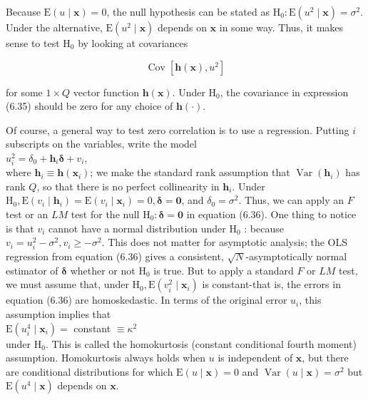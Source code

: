 \documentclass[10pt]{article}
\begin{document}
Because $\mathrm{E}(u \mid \mathbf{x})=0$, the null hypothesis can be stated as $\mathrm{H}_{0}: \mathrm{E}\left(u^{2} \mid \mathbf{x}\right)=\sigma^{2}$. Under the alternative, $\mathrm{E}\left(u^{2} \mid \mathbf{x}\right)$ depends on $\mathbf{x}$ in some way. Thus, it makes sense to test $\mathrm{H}_{0}$ by looking at covariances


\begin{equation*}
\operatorname{Cov}\left[\mathbf{h}(\mathbf{x}), u^{2}\right] \tag{6.35}
\end{equation*}


for some $1 \times Q$ vector function $\mathbf{h}(\mathbf{x})$. Under $\mathrm{H}_{0}$, the covariance in expression (6.35) should be zero for any choice of $\mathbf{h}(\cdot)$.

Of course, a general way to test zero correlation is to use a regression. Putting $i$ subscripts on the variables, write the model\\
$u_{i}^{2}=\delta_{0}+\mathbf{h}_{i} \boldsymbol{\delta}+v_{i}$,\\
where $\mathbf{h}_{i} \equiv \mathbf{h}\left(\mathbf{x}_{i}\right)$; we make the standard rank assumption that $\operatorname{Var}\left(\mathbf{h}_{i}\right)$ has rank $Q$, so that there is no perfect collinearity in $\mathbf{h}_{i}$. Under $\mathrm{H}_{0}, \mathrm{E}\left(v_{i} \mid \mathbf{h}_{i}\right)=\mathrm{E}\left(v_{i} \mid \mathbf{x}_{i}\right)=0, \boldsymbol{\delta}=\mathbf{0}$, and $\delta_{0}=\sigma^{2}$. Thus, we can apply an $F$ test or an $L M$ test for the null $\mathrm{H}_{0}: \boldsymbol{\delta}=\mathbf{0}$ in equation (6.36). One thing to notice is that $v_{i}$ cannot have a normal distribution under $\mathrm{H}_{0}$ : because $v_{i}=u_{i}^{2}-\sigma^{2}, v_{i} \geq-\sigma^{2}$. This does not matter for asymptotic analysis; the OLS regression from equation (6.36) gives a consistent, $\sqrt{N}$-asymptotically normal estimator of $\boldsymbol{\delta}$ whether or not $\mathrm{H}_{0}$ is true. But to apply a standard $F$ or $L M$ test, we must assume that, under $\mathrm{H}_{0}, \mathrm{E}\left(v_{i}^{2} \mid \mathbf{x}_{i}\right)$ is constant-that is, the errors in equation (6.36) are homoskedastic. In terms of the original error $u_{i}$, this assumption implies that\\
$\mathrm{E}\left(u_{i}^{4} \mid \mathbf{x}_{i}\right)=$ constant $\equiv \kappa^{2}$\\
under $\mathrm{H}_{0}$. This is called the homokurtosis (constant conditional fourth moment)\\
assumption. Homokurtosis always holds when $u$ is independent of $\mathbf{x}$, but there are conditional distributions for which $\mathrm{E}(u \mid \mathbf{x})=0$ and $\operatorname{Var}(u \mid \mathbf{x})=\sigma^{2}$ but $\mathrm{E}\left(u^{4} \mid \mathbf{x}\right)$ depends on $\mathbf{x}$.
\end{document}

